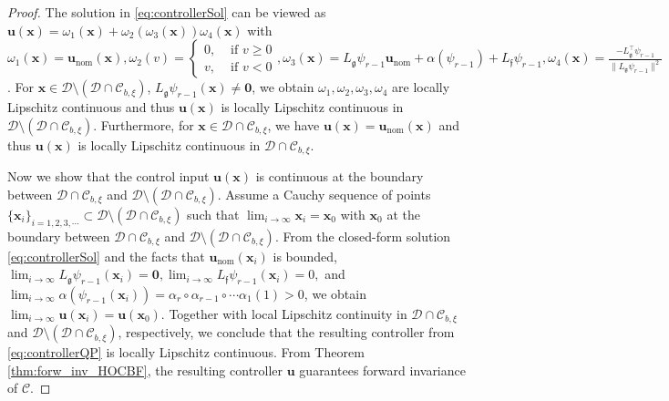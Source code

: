 \documentclass[letterpaper, 10 pt, journal, twoside]{IEEEtran}
\theoremstyle{plain}
\newcommand{\myvar}[1]{\bm{#1}}
\newcommand{\myset}[1]{\mathscr{#1}}
\begin{document}
\begin{proof}
The solution in \eqref{eq:controllerSol} can be viewed as $\myvar{u}(\myvar{x}) = \omega_1(\myvar{x}) + \omega_2(\omega_3(\myvar{x}))\omega_4(\myvar{x})$
with $\omega_1(\myvar{x}) = \myvar{u}_{\text{nom}}(\myvar{x}), \omega_2(v) = \left\{ \begin{smallmatrix} 
0, & \text{ if } v \ge 0 \\
v, & \text{ if } v < 0 \end{smallmatrix}\right. ,  \omega_3(\myvar{x}) = L_{\mathfrak{g}}\psi_{r-1} \myvar{u}_{\text{nom}} + \alpha(\psi_{r-1}) + L_{\mathfrak{f}}\psi_{r-1}, \omega_4(\myvar{x}) =  \tfrac{- L_{\mathfrak{g}}^\top\psi_{r-1} }{\| L_{\mathfrak{g}}\psi_{r-1} \|^2}$. For $\myvar{x} \in \myset{D} \setminus (\myset{D} \cap \myset{C}_{b,\xi})$, $L_{\mathfrak{g}}\psi_{r-1}(\myvar{x}) \neq \myvar{0}$, we obtain $\omega_1, \omega_2, \omega_3, \omega_4 $ are locally Lipschitz continuous and thus $\myvar{u}(\myvar{x})$ is locally Lipschitz continuous in $\myset{D} \setminus (\myset{D} \cap \myset{C}_{b,\xi})$. Furthermore, for $\myvar{x} \in \myset{D} \cap \myset{C}_{b,\xi}$, we have $\myvar{u}(\myvar{x}) = \myvar{u}_{\text{nom}}(\myvar{x})$ and thus $\myvar{u}(\myvar{x})$ is locally Lipschitz continuous in $\myset{D} \cap \myset{C}_{b,\xi}$.

	
Now we show that the control input $ \myvar{u}(\myvar{x}) $ is continuous at the boundary between $\myset{D} \cap \myset{C}_{b,\xi}$ and $\myset{D} \setminus (\myset{D} \cap \myset{C}_{b,\xi})$. Assume a Cauchy sequence of points $ \{ \myvar{x}_i \}_{i = 1,2, 3,\cdots} \subset \myset{D} \setminus (\myset{D} \cap \myset{C}_{b,\xi})$ such that $\lim_{i\to \infty } \myvar{x}_i = \myvar{x}_0   $ with $\myvar{x}_0$ at the boundary between $\myset{D} \cap \myset{C}_{b,\xi}$ and $\myset{D} \setminus (\myset{D} \cap \myset{C}_{b,\xi})$. {From} the closed-form solution \eqref{eq:controllerSol} and the facts that $  \myvar{u}_{\text{nom}}(\myvar{x}_i)$ is bounded, $ \lim_{i\to \infty } L_{\mathfrak{g}}\psi_{r-1}(\myvar{x}_i) = \myvar{0},  \lim_{i\to \infty } L_{\mathfrak{f}}\psi_{r-1}(\myvar{x}_i) = 0,$ and $\lim_{i\to \infty }  \alpha(\psi_{r-1}(\myvar{x}_i)) =  \alpha_{r} \circ \alpha_{r-1} \circ \cdots \alpha_{1}(1)  >0 $, we obtain $ \lim_{i\to \infty }   \myvar{u}(\myvar{x}_i) = \myvar{u}(\myvar{x}_0) $. Together with local Lipschitz continuity in $\myset{D} \cap \myset{C}_{b,\xi}$ and $\myset{D} \setminus (\myset{D} \cap \myset{C}_{b,\xi})$, respectively, we conclude {that} the resulting controller from \eqref{eq:controllerQP} is locally Lipschitz continuous. From Theorem \ref{thm:forw_inv_HOCBF}, the resulting controller $\myvar{u}$ guarantees forward invariance of $\myset{C}$.	 
\end{proof}
\end{document}
